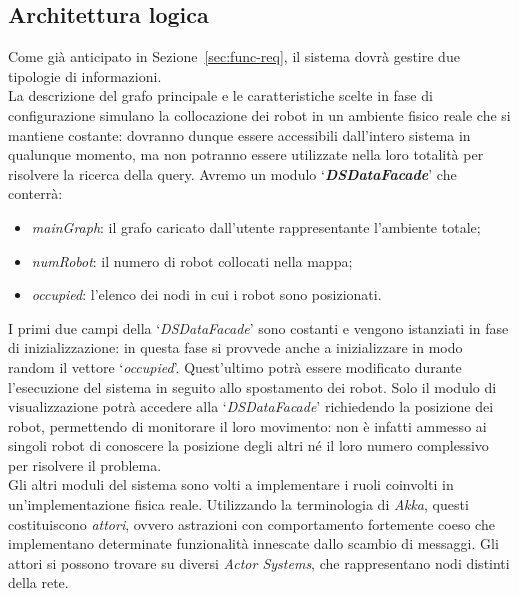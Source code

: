 
\subsection{Architettura logica}
\label{sec:logical-arch}
Come già anticipato in Sezione~\ref{sec:func-req},
il sistema dovrà gestire due tipologie di informazioni.\\

La descrizione del grafo principale e le caratteristiche scelte
in fase di configurazione simulano la collocazione dei robot in
un ambiente fisico reale che si mantiene costante: dovranno dunque
essere accessibili dall'intero sistema in qualunque momento,
ma non potranno essere utilizzate
nella loro totalità
per risolvere la ricerca della query.
Avremo un modulo `\textbf{\emph{DSDataFacade}}' che conterrà:
\begin{itemize}
\item \emph{mainGraph}: il grafo caricato dall'utente rappresentante
  l'ambiente totale;
\item \emph{numRobot}: il numero di robot collocati nella mappa;
\item \emph{occupied}: l'elenco dei nodi in cui i robot sono posizionati.
\end{itemize}
I primi due campi della `\emph{DSDataFacade}' sono costanti e vengono
istanziati in fase di inizializzazione: in questa fase si provvede anche
a inizializzare in modo random il vettore `\emph{occupied}'. Quest'ultimo
potrà essere modificato durante l'esecuzione del sistema in seguito allo
spostamento dei robot.
Solo il modulo di visualizzazione potrà accedere alla `\emph{DSDataFacade}'
richiedendo la posizione dei robot, permettendo di monitorare
il loro movimento: non è infatti ammesso ai singoli robot di conoscere
la posizione degli altri né il loro numero complessivo per risolvere
il problema.\\

Gli altri moduli del sistema sono volti a implementare i
ruoli coinvolti in un'implementazione fisica reale.
Utilizzando la terminologia di \emph{Akka}, questi costituiscono
\emph{attori}, ovvero astrazioni con comportamento fortemente coeso
che implementano determinate funzionalità innescate dallo scambio di
messaggi. Gli attori si possono trovare su diversi \emph{Actor Systems},
che rappresentano nodi distinti della rete.

